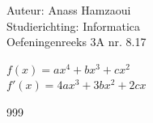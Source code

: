 \documentclass[a4paper]{article}
\begin{document}
  
\noindent \large Auteur: Anass Hamzaoui \\
\noindent \large Studierichting: Informatica \\
\noindent \large Oefeningenreeks 3A nr. 8.17\\

\medskip

\normalsize

$f(x) = ax^4+bx^3+cx^2$\\

$f'(x) = 4ax^3+3bx^2+2cx$\\

\begin{thebibliography}{999}
\end{thebibliography}
\end{document}
